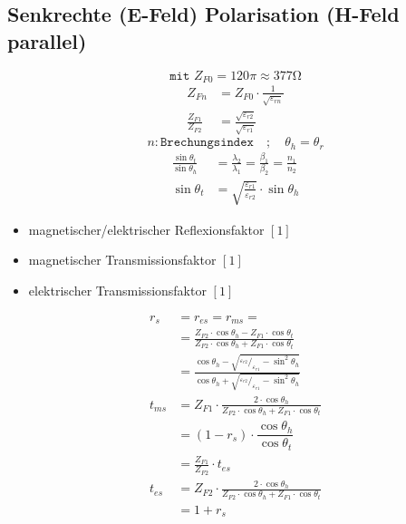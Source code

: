 \subsection{Senkrechte (E-Feld) Polarisation (H-Feld parallel)}


\[ \boxed{\texttt{mit } Z_{F0} = 120\pi \approx 377\si{\ohm}} \]
\begin{align*}
    Z_{Fn}                & = Z_{F0}\cdot\frac{1}{\sqrt{\varepsilon_{rn}}}            \\
    \frac{Z_{F1}}{Z_{F2}} & = \frac{\sqrt{\varepsilon_{r2}}}{\sqrt{\varepsilon_{r1}}}
\end{align*}
\[ n: \texttt{Brechungsindex} \quad ; \quad \theta_h = \theta_r\]
\begin{align*}
    \frac{\sin\theta_t}{\sin\theta_h} & = \frac{\lambda_2}{\lambda_1}= \frac{\beta_1}{\beta_2}= \frac{n_1}{n_2} \\
    \sin\theta_t                      & = \sqrt{\frac{\varepsilon_{r1}}{\varepsilon_{r2}}}\cdot \sin\theta_h
\end{align*}

\begin{itemize}
    \item magnetischer/elektrischer Reflexionsfaktor $[1]$
    \item magnetischer Transmissionsfaktor $[1]$
    \item elektrischer Transmissionsfaktor $[1]$
\end{itemize}
\begin{align*}
    r_s    & =  r_{es} = r_{ms} =                                                                                                                                            \\
           & = \frac{Z_{F2} \cdot \cos \theta_h-Z_{F1} \cdot \cos \theta_t}{Z_{F2} \cdot \cos \theta_h+Z_{F1} \cdot \cos \theta_t}                                           \\
           & = \frac{\cos\theta_h-\sqrt{^{\varepsilon_{r2}}/_{\varepsilon_{r1}}-\sin^2\theta_h}}{\cos\theta_h+\sqrt{^{\varepsilon_{r2}}/_{\varepsilon_{r1}}-\sin^2\theta_h}} \\
    t_{ms} & = Z_{F1} \cdot \frac{2 \cdot \cos \theta_h}{Z_{F2} \cdot \cos \theta_h+Z_{F1} \cdot \cos \theta_t}                                                              \\
           & = (1 - r_s) \cdot \dfrac{\cos \theta_h}{\cos \theta_t}                                                                                                          \\
           & = \frac{Z_{F1}}{Z_{F2}}\cdot t_{es}                                                                                                                             \\
    t_{es} & = Z_{F2} \cdot \frac{2 \cdot \cos \theta_h}{Z_{F2} \cdot \cos \theta_h+Z_{F1} \cdot \cos \theta_t}                                                              \\
           & = 1+r_s
\end{align*}

